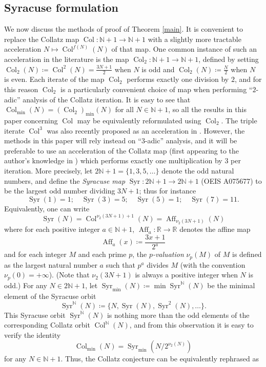 \documentclass[12pt,a4paper,reqno]{amsart}
\numberwithin{equation}{section}
\theoremstyle{plain}
\theoremstyle{definition}
\newcommand\R{\mathbb{R}}
\newcommand\N{\mathbb{N}}
\newcommand\Aff{{\operatorname{Aff}}}
\newcommand\Col{{\operatorname{Col}}}
\newcommand\Syr{{\operatorname{Syr}}}
\begin{document}
\subsection{Syracuse formulation}

We now discuss the methods of proof of Theorem \ref{main}.  It is convenient to replace the Collatz map $\Col \colon \N+1 \to \N+1$ with a slightly more tractable acceleration $N \mapsto \Col^{f(N)}(N)$ of that map.  One common instance of such an acceleration in the literature is the map $\Col_2 \colon \N+1 \to \N+1$, defined by setting $\Col_2(N) \coloneqq \Col^2(N) = \frac{3N+1}{2}$ when $N$ is odd and $\Col_2(N) \coloneqq \frac{N}{2}$ when $N$ is even.  Each iterate of the map $\Col_2$ performs exactly one division by $2$, and for this reason $\Col_2$ is a particularly convenient choice of map when performing ``$2$-adic'' analysis of the Collatz iteration.  It is easy to see that $\Col_{\min}(N) = (\Col_2)_{\min}(N)$ for all $N \in \N+1$, so all the results in this paper concerning $\Col$ may be equivalently reformulated using $\Col_2$.  The triple iterate $\Col^3$ was also recently proposed as an acceleration in \cite{carletti}.  However, the methods in this paper will rely instead on ``$3$-adic'' analysis, and it will be preferable to use an acceleration of the Collatz map (first appearing to the author's knowledge in \cite{crandall}) which performs exactly one multiplication by $3$ per iteration.  More precisely, let $2\N+1 = \{1,3,5,\dots\}$ denote the odd natural numbers, and define the \emph{Syracuse map} $\Syr \colon 2\N+1 \to 2\N+1$ (OEIS A075677) to be the largest odd number dividing $3N+1$; thus for instance
$$ \Syr(1)=1; \quad \Syr(3) = 5; \quad \Syr(5) = 1; \quad \Syr(7) = 11.$$
Equivalently, one can write
\begin{equation}\label{S-def}
 \Syr(N) = \Col^{\nu_2(3N+1)+1}(N) = \Aff_{\nu_2(3N+1)}(N)
\end{equation}
where for each positive integer $a \in \N+1$, $\Aff_a\colon \R \to \R$ denotes the affine map
$$ \Aff_a(x) \coloneqq \frac{3x+1}{2^a}$$
and for each integer $M$ and each prime $p$, the \emph{$p$-valuation} $\nu_p(M)$ of $M$ is defined as the largest natural number $a$ such that $p^a$ divides $M$ (with the convention $\nu_p(0) = +\infty$).  (Note that $\nu_2(3N+1)$ is always a positive integer when $N$ is odd.)  For any $N \in 2\N+1$, let $\Syr_{\min}(N) \coloneqq \min \Syr^\N(N)$ be the minimal element of the Syracuse orbit 
$$\Syr^\N(N) \coloneqq \{ N, \Syr(N), \Syr^2(N), \dots\}.$$
This Syracuse orbit $\Syr^\N(N)$ is nothing more than the odd elements of the corresponding Collatz orbit $\Col^\N(N)$, and from this observation it is easy to verify the identity
\begin{equation}\label{c-ident}
 \Col_{\min}(N) = \Syr_{\min}( N / 2^{\nu_2(N)} )
\end{equation}
for any $N \in \N+1$.  Thus, the Collatz conjecture can be equivalently rephrased as
\end{document}
